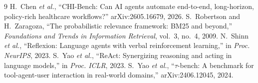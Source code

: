 \documentclass[conference]{IEEEtran}
\begin{document}
\begin{thebibliography}{9}
 H.~Chen \emph{et al.}, ``CHI-Bench: Can AI agents automate end-to-end,
  long-horizon, policy-rich healthcare workflows?'' arXiv:2605.16679, 2026.
 S.~Robertson and H.~Zaragoza, ``The probabilistic relevance framework: BM25 and
  beyond,'' \emph{Foundations and Trends in Information Retrieval}, vol.~3, no.~4, 2009.
 N.~Shinn \emph{et al.}, ``Reflexion: Language agents with verbal
  reinforcement learning,'' in \emph{Proc. NeurIPS}, 2023.
 S.~Yao \emph{et al.}, ``ReAct: Synergizing reasoning and acting in language
  models,'' in \emph{Proc. ICLR}, 2023.
 S.~Yao \emph{et al.}, ``$\tau$-bench: A benchmark for tool-agent-user
  interaction in real-world domains,'' arXiv:2406.12045, 2024.
\end{thebibliography}
\end{document}
